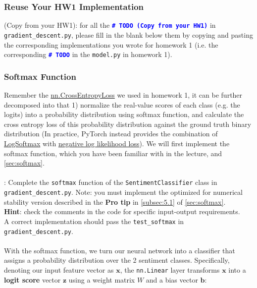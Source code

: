 \subsubsection{Reuse Your HW1 Implementation}
\todo{} (Copy from your HW1): for all the \textcolor{blue}{\texttt{\textbf{\#~TODO (Copy from your HW1)}}} in \texttt{gradient\_descent.py}, please fill in the blank below them by copying and pasting the corresponding implementations you wrote for homework 1 (i.e. the corresponding \textcolor{blue}{\texttt{\textbf{\#~TODO}}} in the \texttt{model.py} in homework 1).

\subsubsection{Softmax Function}
Remember the \href{https://pytorch.org/docs/stable/generated/torch.nn.CrossEntropyLoss.html}{nn.CrossEntropyLoss} we used in homework 1, it can be further decomposed into that 1) normalize the real-value scores of each class (e.g. the logits) into a probability distribution
using softmax function, and calculate the cross entropy loss of this probability distribution against the ground truth binary distribution (In practice, PyTorch instead provides the combination of \href{https://pytorch.org/docs/stable/generated/torch.nn.LogSoftmax.html#torch.nn.LogSoftmax}{LogSoftmax} with \href{https://pytorch.org/docs/stable/generated/torch.nn.NLLLoss.html#torch.nn.NLLLoss}{negative log likelihood loss}).  We will first implement the softmax function, which you have been familiar with in the lecture, and \autoref{sec:softmax}.
\\\\
\noindent \todo{}: Complete the \texttt{softmax} function of the \texttt{SentimentClassifier} class in \texttt{gradient\_descent.py}. Note: you must implement the optimized for numerical stability version described in the \textbf{Pro tip} in \autoref{subsec:5.1} of \autoref{sec:softmax}.
\\
\noindent \textbf{Hint}: check the comments in the code for specific input-output requirements.
\\
A correct implementation should pass the \texttt{test\_softmax} in \texttt{gradient\_descent.py}.
\\\\
\noindent With the softmax function, we turn our neural network into a classifier that assigns a probability distribution over the 2 sentiment classes. Specifically, denoting our input feature vector as $\mathbf{x}$, the \texttt{nn.Linear} layer transforms $\mathbf{x}$ into a \textbf{logit score} vector $\mathbf{z}$ using a weight matrix $W$ and a bias vector $\mathbf{b}$:

